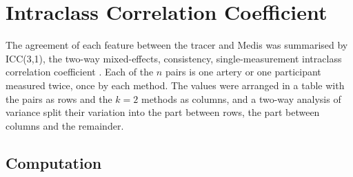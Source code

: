 \chapter{Intraclass Correlation Coefficient}
\label{app:icc}

The agreement of each feature between the tracer and Medis was summarised by ICC(3,1), the two-way mixed-effects, consistency, single-measurement intraclass correlation coefficient \cite{koo2016icc}.
Each of the $n$ pairs is one artery or one participant measured twice, once by each method.
The values were arranged in a table with the pairs as rows and the $k = 2$ methods as columns, and a two-way analysis of variance split their variation into the part between rows, the part between columns and the remainder.

\section{Computation}
\label{app:icc-computation}

